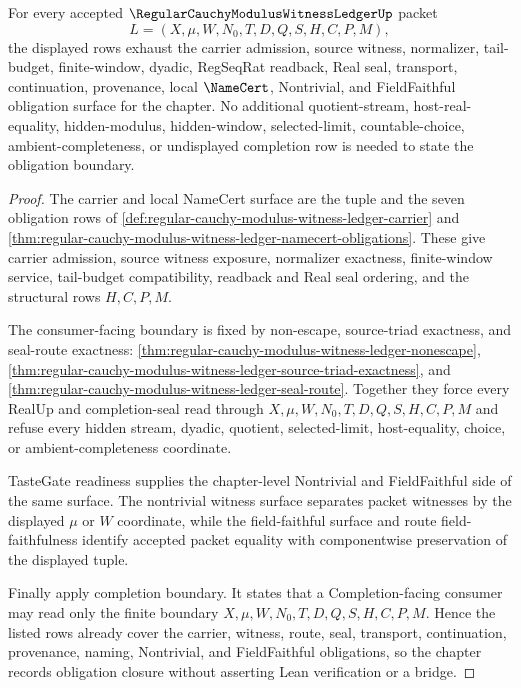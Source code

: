 \begin{theorem}
\label{thm:regular-cauchy-modulus-witness-ledger-obligation-closure-route}
For every accepted $\RegularCauchyModulusWitnessLedgerUp$ packet
$$
L=(X,\mu,W,N_0,T,D,Q,S,H,C,P,M),
$$
the displayed rows exhaust the carrier admission, source witness, normalizer, tail-budget, finite-window, dyadic, RegSeqRat readback, Real seal, transport, continuation, provenance, local $\NameCert$, Nontrivial, and FieldFaithful obligation surface for the chapter. No additional quotient-stream, host-real-equality, hidden-modulus, hidden-window, selected-limit, countable-choice, ambient-completeness, or undisplayed completion row is needed to state the obligation boundary.
\end{theorem}
\begin{proof}
The carrier and local NameCert surface are the tuple and the seven obligation rows of \autoref{def:regular-cauchy-modulus-witness-ledger-carrier} and \autoref{thm:regular-cauchy-modulus-witness-ledger-namecert-obligations}. These give carrier admission, source witness exposure, normalizer exactness, finite-window service, tail-budget compatibility, readback and Real seal ordering, and the structural rows $H,C,P,M$.

The consumer-facing boundary is fixed by non-escape, source-triad exactness, and seal-route exactness: \autoref{thm:regular-cauchy-modulus-witness-ledger-nonescape}, \autoref{thm:regular-cauchy-modulus-witness-ledger-source-triad-exactness}, and \autoref{thm:regular-cauchy-modulus-witness-ledger-seal-route}. Together they force every RealUp and completion-seal read through $X,\mu,W,N_0,T,D,Q,S,H,C,P,M$ and refuse every hidden stream, dyadic, quotient, selected-limit, host-equality, choice, or ambient-completeness coordinate.

TasteGate readiness supplies the chapter-level Nontrivial and FieldFaithful side of the same surface. The nontrivial witness surface separates packet witnesses by the displayed $\mu$ or $W$ coordinate, while the field-faithful surface and route field-faithfulness identify accepted packet equality with componentwise preservation of the displayed tuple.

Finally apply completion boundary. It states that a Completion-facing consumer may read only the finite boundary $X,\mu,W,N_0,T,D,Q,S,H,C,P,M$. Hence the listed rows already cover the carrier, witness, route, seal, transport, continuation, provenance, naming, Nontrivial, and FieldFaithful obligations, so the chapter records obligation closure without asserting Lean verification or a bridge.
\end{proof}

